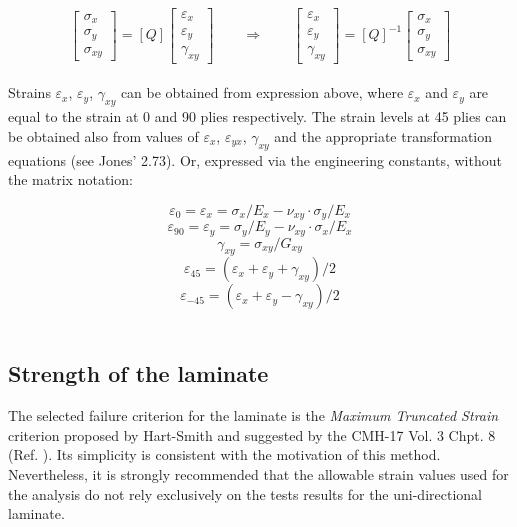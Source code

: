 \documentclass[a4paper,11pt]{article}
\begin{document}
\begin{equation*}
	\begin{bmatrix}
		\sigma_{x} \\ 
		\sigma_{y} \\ 
		\sigma_{xy} 
	\end{bmatrix}
	= [Q] 
	\begin{bmatrix} 
		\varepsilon_{x} \\ 
		\varepsilon_{y} \\ 
		\gamma_{xy} 
	\end{bmatrix}
	\qquad \Rightarrow \qquad
	\begin{bmatrix} 
		\varepsilon_{x} \\ 
		\varepsilon_{y} \\ 
		\gamma_{xy} 
	\end{bmatrix}
	= [Q]^{-1} 
	\begin{bmatrix} 
		\sigma_{x} \\ 
		\sigma_{y} \\ 
		\sigma_{xy} 
	\end{bmatrix}
\end{equation*}
\\

Strains  $\varepsilon_{x}$, $\varepsilon_{y}$, $\gamma_{xy}$ can be obtained from expression above, where $\varepsilon_{x}$ and $\varepsilon_{y}$ are equal to the strain at 0\textdegree{} and 90\textdegree{} plies respectively. The strain levels at 45\textdegree{} plies can be obtained also from values
of $\varepsilon_{x}$, $\varepsilon_{yx}$, $\gamma_{xy}$ and the appropriate transformation equations (see Jones' 2.73). Or, expressed via the engineering constants, without the matrix notation:

	$$	\varepsilon_{0} = \varepsilon_{x} = \sigma_{x} / E_{x} - \nu_{xy} \cdot \sigma_{y} / E_{x} 	$$
	$$	\varepsilon_{90} = \varepsilon_{y} = \sigma_{y} / E_{y} - \nu_{xy} \cdot \sigma_{x} / E_{x}	$$
	$$	\gamma_{xy} = \sigma_{xy} / G_{xy}	$$
	$$	\varepsilon_{45} = (\varepsilon_{x} + \varepsilon_{y} + \gamma_{xy}) / 2	$$
	$$	\varepsilon_{-45} = (\varepsilon_{x} + \varepsilon_{y} - \gamma_{xy}) / 2	$$
\\

\subsection{Strength of the laminate}

The selected failure criterion for the laminate is the \emph{Maximum Truncated Strain} criterion proposed by Hart-Smith and suggested
by the CMH-17 Vol. 3 Chpt. 8 (Ref. \cite{CMH-17}). Its simplicity is consistent with the motivation of this method. Nevertheless, it is strongly 
recommended that the allowable strain values used for the analysis do not rely exclusively on the tests results for the 
uni-directional laminate.
\\
\end{document}
